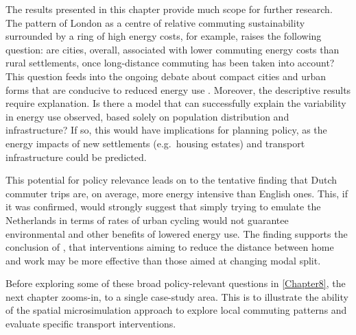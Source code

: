 The results presented in this chapter provide much scope for further research.
The pattern of London as a centre of relative commuting sustainability surrounded by
a ring of high energy costs, for example, raises the following question:
are cities, overall, associated
with lower commuting energy costs than rural settlements, once long-distance
commuting has been taken into account? This question feeds into the ongoing
debate about compact cities and urban forms that are conducive to reduced energy
use \citep{Levinson2012}. Moreover, the descriptive results require explanation.
Is there a model that can successfully explain the variability in energy
use observed, based solely on population distribution and infrastructure?
If so, this would have implications for planning policy, as the energy impacts
of new settlements (e.g.~housing estates) and transport infrastructure could
be predicted.

This potential for policy relevance leads on to the tentative
finding that Dutch commuter trips are, on average, more energy intensive than
English ones. This, if it was confirmed, would strongly suggest that simply
trying to emulate the Netherlands in terms of rates of urban cycling
would not guarantee environmental and other benefits of lowered energy use.
The finding supports the conclusion of \citet{Boussauw2009}, that
interventions aiming to reduce the distance between
home and work may be more effective than those aimed at changing
modal split.

Before exploring some of these broad policy-relevant questions 
in \cref{Chapter8}, the next chapter zooms-in, to a single case-study area.
This is to illustrate the ability of the spatial microsimulation approach to
explore local commuting patterns and evaluate specific transport interventions.

